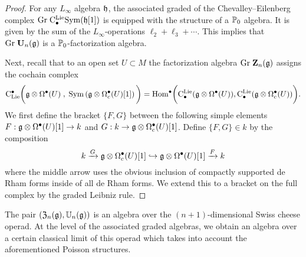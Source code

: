 \documentclass[11pt]{amsart}
\numberwithin{equation}{section}
\def\brian{\textcolor{blue}{BW: }\textcolor{blue}}
\begin{document}
\begin{proof}
For any $L_\infty$ algebra $\mathfrak h$, the associated graded of the Chevalley--Eilenberg complex ${\rm Gr} \; {\rm C}^{\rm Lie}_\bullet {\rm Sym} (\mathfrak h [1])$ is equipped with the structure of a $\mathbb P_0$ algebra.
It is given by the sum of the $L_\infty$-operations $\ell_2 + \ell_3 + \cdots$. 
This implies that ${\rm Gr} \; \mathbf U_n (\mathfrak g)$ is a $\mathbb P_0$-factorization algebra.

Next, recall that to an open set $U \subset M$ the factorization algebra ${\rm Gr} \; \mathbf Z_n (\mathfrak g)$ assigns the cochain complex
\[
{\rm C}_{{\rm Lie}}^\bullet\bigg(\mathfrak g \otimes \Omega^\bullet (U) \; , \; {\rm Sym} \left(\mathfrak g \otimes \Omega^\bullet_c(U) [1]\right) \bigg) = {\rm Hom}^\bullet \bigg({\rm C}^{\rm Lie}_\bullet(\mathfrak g \otimes \Omega^\bullet(U)) , {\rm C}^{\rm Lie}_\bullet (\mathfrak g \otimes \Omega^\bullet_c(U)) \bigg).
\]
We first define the bracket $\{F,G\}$ between the following simple elements $F : \mathfrak g \otimes \Omega^\bullet (U)[1] \to k$ and $G : k \to \mathfrak g \otimes \Omega^\bullet_c(U)[1]$. 
Define $\{F, G\} \in k$ by the composition
\[
k \xrightarrow{G} \mathfrak g \otimes \Omega^\bullet_c(U)[1] \hookrightarrow \mathfrak g \otimes \Omega^\bullet(U)[1] \xrightarrow{F} k
\]
where the middle arrow uses the obvious inclusion of compactly supported de Rham forms inside of all de Rham forms. 
We extend this to a bracket on the full complex by the graded Leibniz rule. 

\end{proof}

The pair $(\mathfrak Z_n(\mathfrak g), \mathbb U_n(\mathfrak g))$ is an algebra over the $(n+1)$-dimensional Swiss cheese operad. 
At the level of the associated graded algebras, we obtain an algebra over a certain classical limit of this operad which takes into account the aforementioned Poisson structures.
\end{document}
